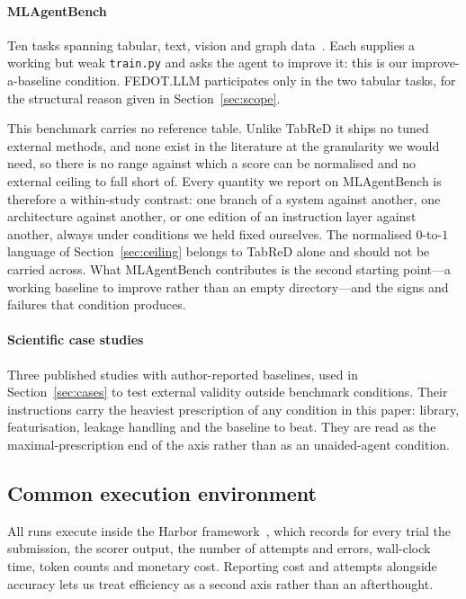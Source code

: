 \paragraph{MLAgentBench} Ten tasks spanning tabular, text, vision and graph
data~\citep{huang2024mlagentbench}. Each supplies a working but weak
\texttt{train.py} and asks the agent to improve it: this is our
improve-a-baseline condition. FEDOT.LLM participates only in the two tabular
tasks, for the structural reason given in Section~\ref{sec:scope}.

This benchmark carries no reference table. Unlike TabReD it ships no tuned
external methods, and none exist in the literature at the granularity we would
need, so there is no range against which a score can be normalised and no
external ceiling to fall short of. Every quantity we report on MLAgentBench is
therefore a within-study contrast: one branch of a system against another, one
architecture against another, or one edition of an instruction layer against
another, always under conditions we held fixed ourselves. The normalised
$0$-to-$1$ language of Section~\ref{sec:ceiling} belongs to TabReD alone and
should not be carried across. What MLAgentBench contributes is the second
starting point---a working baseline to improve rather than an empty
directory---and the signs and failures that condition produces.

\paragraph{Scientific case studies} Three published studies with author-reported
baselines, used in Section~\ref{sec:cases} to test external validity outside
benchmark conditions. Their instructions carry the heaviest prescription of any
condition in this paper: library, featurisation, leakage handling and the
baseline to beat. They are read as the maximal-prescription end of the axis
rather than as an unaided-agent condition.

\subsection{Common execution environment}

All runs execute inside the Harbor framework~\citep{harbor2026}, which records for every trial the
submission, the scorer output, the number of attempts and errors, wall-clock
time, token counts and monetary cost. Reporting cost and attempts alongside
accuracy lets us treat efficiency as a second axis rather than an afterthought.

